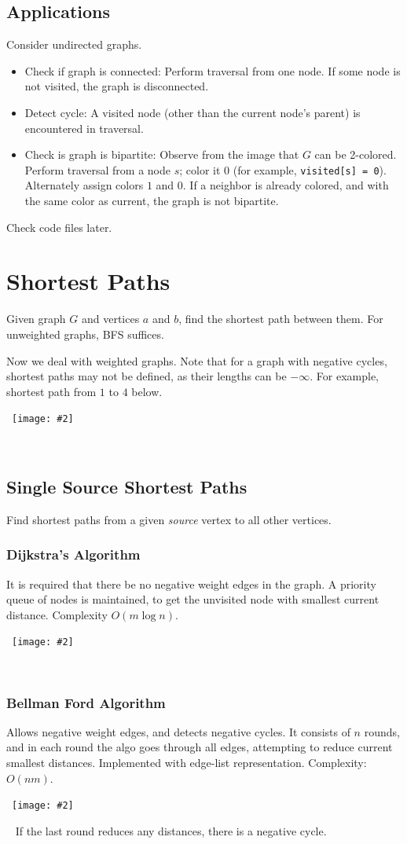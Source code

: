\documentclass{article}
\newcommand{\I}[1]{\textit{#1}}
\newcommand{\T}[1]{\texttt{#1}}
\newcommand{\image}[2]{\
    \begin{center}\
        \texttt{[image: \#2]}\
    \end{center}\
}
\begin{document}
\begin{sloppypar}
    \subsection{Applications}
    Consider undirected graphs.
    \begin{itemize}
        \item Check if graph is connected: Perform traversal from one node. If some node is not visited, the graph is disconnected.
        \item Detect cycle: A visited node (other than the current node's parent) is encountered in traversal.
        \item Check is graph is bipartite: Observe from the image that $G$ can be 2-colored. Perform traversal from a node $s$; color it $0$ (for example, \T{visited[s] = 0}). Alternately assign colors $1$ and $0$. If a neighbor is already colored, and with the same color as current, the graph is not bipartite.
    \end{itemize}
    Check code files later.

    \newpage

    \section{Shortest Paths}
    Given graph $G$ and vertices $a$ and $b$, find the shortest path between them. For unweighted graphs, BFS suffices.
    \par \noindent Now we deal with weighted graphs. Note that for a graph with negative cycles, shortest paths may not be defined, as their lengths can be $-\infty$. For example, shortest path from $1$ to $4$ below.
    \image{0.4}{../images/neg_cycle.png}

    \subsection{Single Source Shortest Paths}
    Find shortest paths from a given \I{source} vertex to all other vertices.

    \subsubsection{Dijkstra's Algorithm}
    It is required that there be no negative weight edges in the graph. A priority queue of nodes is maintained, to get the unvisited node with smallest current distance. Complexity $O(m\log n)$.
    \image{0.8}{../images/dijkstra.png}

    \subsubsection{Bellman Ford Algorithm}
    Allows negative weight edges, and detects negative cycles. It consists of $n$ rounds, and in each round the algo goes through all edges, attempting to reduce current smallest distances. Implemented with edge-list representation. Complexity: $O(nm)$.
    \image{0.8}{../images/bellman-ford.png}
    If the last round reduces any distances, there is a negative cycle.


\end{sloppypar}
\end{document}
